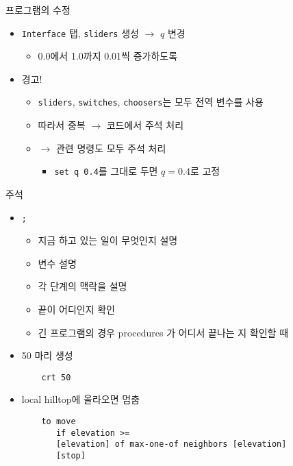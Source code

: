 \documentclass[hyperref={unicode}]{beamer}
\begin{document}
\begin{frame}[fragile]{프로그램의 수정}
\begin{itemize}
\item \verb|Interface| 탭, \verb|sliders| 생성 $\rightarrow$ $q$ 변경
	\begin{itemize}
	\item 0.0에서 1.0까지 0.01씩 증가하도록
	\end{itemize}
\item 경고!
	\begin{itemize}
	\item \verb|sliders|, \verb|switches|, \verb|choosers|는 모두 전역 변수를 사용
	\item 따라서 중복 $\rightarrow$ 코드에서 주석 처리
	\item $\rightarrow$ 관련 명령도 모두 주석 처리 
		\begin{itemize}
		\item \verb|set q 0.4|를 그대로 두면 $q = 0.4$로 고정
		\end{itemize}
	\end{itemize}	
\end{itemize}	
\end{frame}

\begin{frame}[fragile]{주석}
\begin{itemize}
\item \verb|;|
	\begin{itemize}
	\item 지금 하고 있는 일이 무엇인지 설명
	\item 변수 설명
	\item 각 단계의 맥락을 설명
	\item 끝이 어디인지 확인
	\item 긴 프로그램의 경우 procedures 가 어디서 끝나는 지 확인할 때
	\end{itemize}
\end{itemize}	
\end{frame}

\begin{frame}[fragile]
\begin{itemize}
\item 50 마리 생성
	\begin{verbatim}
	crt 50
	\end{verbatim}
\item local hilltop에 올라오면 멈춤
	\begin{verbatim}
	to move
       if elevation >= 
       [elevation] of max-one-of neighbors [elevation] 
       [stop]
	\end{verbatim}
\end{itemize}	
\end{frame}
\end{document}
